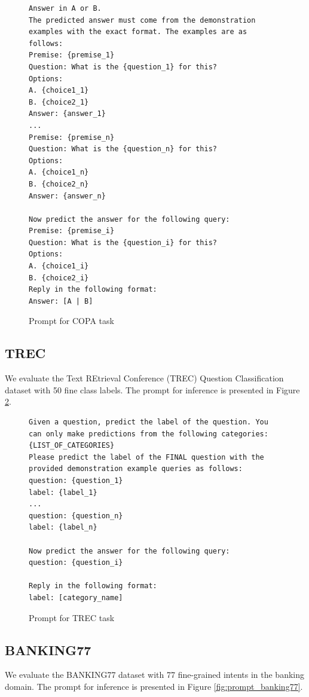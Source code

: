 \documentclass{article}
\theoremstyle{plain}
\theoremstyle{definition}
\theoremstyle{remark}
\begin{document}
\begin{figure}[ht]
    \centering
    {\tiny
\begin{lstlisting}
Answer in A or B.
The predicted answer must come from the demonstration examples with the exact format. The examples are as follows:
Premise: {premise_1}
Question: What is the {question_1} for this?
Options:
A. {choice1_1}
B. {choice2_1}
Answer: {answer_1}
...
Premise: {premise_n}
Question: What is the {question_n} for this?
Options:
A. {choice1_n}
B. {choice2_n}
Answer: {answer_n}

Now predict the answer for the following query:
Premise: {premise_i}
Question: What is the {question_i} for this?
Options:
A. {choice1_i}
B. {choice2_i}
Reply in the following format:
Answer: [A | B]
\end{lstlisting}
}
    \caption{Prompt for COPA task}
    \label{fig:prompt_copa}
\end{figure}





\subsection{TREC}
We evaluate the Text REtrieval Conference (TREC) Question Classification dataset with 50 fine class labels. The prompt for inference is presented in Figure \ref{fig:prompt_trec}. %

\begin{figure}[ht]
    \centering
    {\tiny
\begin{lstlisting}
Given a question, predict the label of the question. You can only make predictions from the following categories: {LIST_OF_CATEGORIES}
Please predict the label of the FINAL question with the provided demonstration example queries as follows:
question: {question_1}
label: {label_1}
...
question: {question_n}
label: {label_n}

Now predict the answer for the following query:
question: {question_i}

Reply in the following format:
label: [category_name]
\end{lstlisting}
}
    \caption{Prompt for TREC task}
    \label{fig:prompt_trec}
\end{figure}



\subsection{BANKING77}
We evaluate the BANKING77 dataset with 77 fine-grained intents in the banking domain. The prompt for inference is presented in Figure \ref{fig:prompt_banking77}. %
\end{document}
